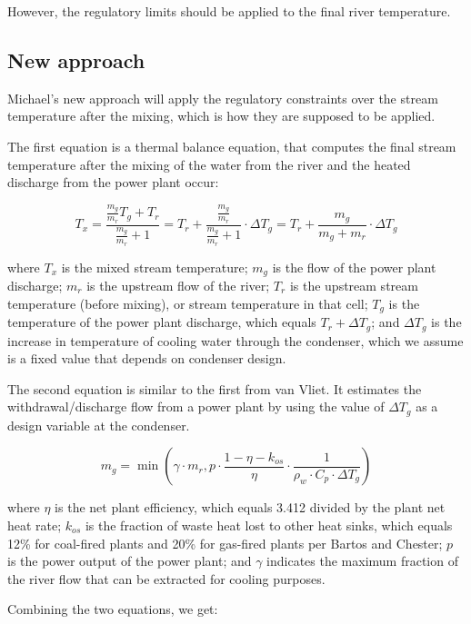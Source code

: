\documentclass[11pt, oneside]{article}   	%
\begin{document}
However, the regulatory limits should be applied to the final river temperature.

\subsection{New approach}

Michael's new approach will apply the regulatory constraints over the stream temperature after the mixing, which is how they are supposed to be applied.

The first equation is a thermal balance equation, that computes the final stream temperature after the mixing of the water from the river and the heated discharge from the power plant occur:

\begin{equation}
T_x = \frac{\frac{m_g}{m_r}T_g + T_r}{\frac{m_g}{m_r} + 1} = T_r + \frac{\frac{m_g}{m_r}}{\frac{m_g}{m_r} + 1}\cdot \Delta T_g = T_r + \frac{m_g}{m_g + m_r}\cdot \Delta T_g
\end{equation}

where $T_x$ is the mixed stream temperature; $m_g$ is the flow of the power plant discharge; $m_r$ is the upstream flow of the river; $T_r$ is the upstream stream temperature (before mixing), or stream temperature in that cell; $T_g$ is the temperature of the power plant discharge, which equals $T_r + \Delta T_g$; and $\Delta T_g$ is the increase in temperature of cooling water through the condenser, which we assume is a fixed value that depends on condenser design. 

The second equation is similar to the first from van Vliet. It estimates the withdrawal/discharge flow from a power plant by using the value of $\Delta T_g$ as a design variable at the condenser.

\begin{equation}
m_g = \min{\left (\gamma \cdot m_r, p \cdot \frac{1-\eta - k_{os}}{\eta} \cdot \frac{1}{\rho_w \cdot C_p \cdot \Delta T_{g}}\right)}
\end{equation}

where $\eta$ is the net plant efficiency, which equals 3.412 divided by the plant net heat rate; $k_{os}$ is the fraction of waste heat lost to other heat sinks, which equals 12\% for coal-fired plants and 20\% for gas-fired plants per Bartos and Chester; $p$ is the power output of the power plant; and $\gamma$ indicates the maximum fraction of the river flow that can be extracted for cooling purposes. 

Combining the two equations, we get:
\end{document}
